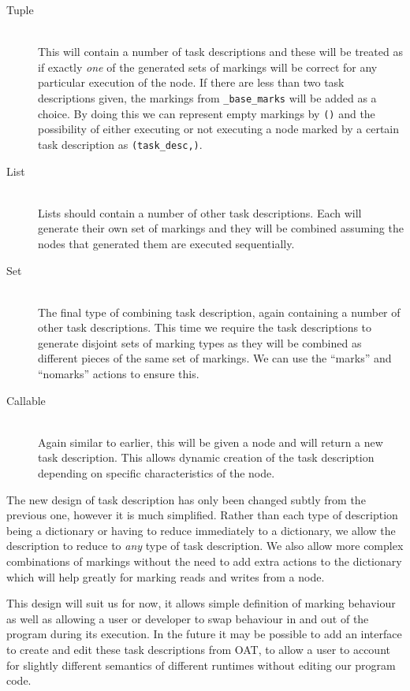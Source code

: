 \documentclass[twoside,a4paper]{report}
\begin{document}
\begin{description}
\item[Tuple] \hfill \\
This will contain a number of task descriptions and these will be treated as if exactly \textit{one} of the generated sets of markings will be correct
for any particular execution of the node. If there are less than two task descriptions given, the markings from \texttt{\_base\_marks} will be added as a choice.
By doing this we can represent empty markings by \texttt{()} and the possibility of either executing or not executing a node marked by a certain task description
as \texttt{(task\_desc,)}.

\item[List] \hfill \\
Lists should contain a number of other task descriptions. Each will generate their own set of markings and they will be combined assuming the nodes
that generated them are executed sequentially.

\item[Set] \hfill \\
The final type of combining task description, again containing a number of other task descriptions. This time we require the task descriptions to
generate disjoint sets of marking types as they will be combined as different pieces of the same set of markings. We can use the ``marks'' and ``nomarks''
actions to ensure this.

\item[Callable] \hfill \\
Again similar to earlier, this will be given a node and will return a new task description. This allows dynamic creation of the task description depending on
specific characteristics of the node.

\end{description}

The new design of task description has only been changed subtly from the previous one, however it is much simplified. Rather than each type of
description being a dictionary or having to reduce immediately to a dictionary, we allow the description to reduce to \textit{any} type of 
task description. We also allow more complex combinations of markings without the need to add extra actions to the dictionary which will
help greatly for marking reads and writes from a node.

This design will suit us for now, it allows simple definition of marking behaviour as well as allowing a user or developer to swap behaviour in
and out of the program during its execution. In the future it may be possible to add an interface to create and edit these task descriptions from
OAT, to allow a user to account for slightly different semantics of different runtimes without editing our program code.
\end{document}

